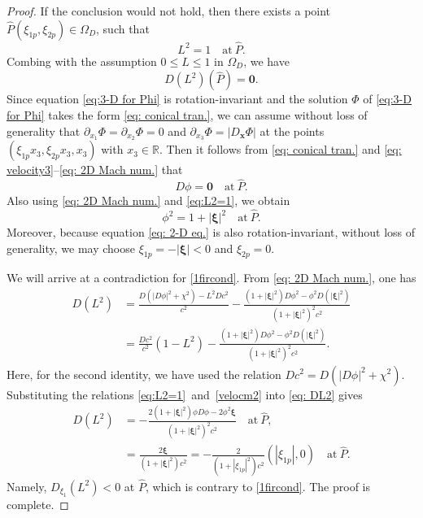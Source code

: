 \documentclass[reqno,12pt]{amsart}
\numberwithin{equation}{section}
\begin{document}
\begin{proof}
     If the conclusion would not hold, then there exists a point $\hat{P}(\xi_{1p},\xi_{2p})\in \Omega_D$, such that
     \begin{equation}\label{eq:L2=1}
         L^2=1\quad\text{at}~\hat{P}.
     \end{equation}
     Combing with the assumption $0\leq L\leq1$ in $\Omega_D$, we have
     \begin{equation}\label{1fircond}
         D(L^2)(\hat{P})=\bm{0}.
     \end{equation}
     Since equation \eqref{eq:3-D for Phi} is rotation-invariant and the solution $\Phi$ of \eqref{eq:3-D for Phi} takes the form \eqref{eq: conical tran.}, we can assume without loss of generality that $\partial_{x_1}\Phi=\partial_{x_2}\Phi=0$ and $\partial_{x_3}\Phi=|D_{\bm{x}}\Phi|$ at the points $(\xi_{1p}x_3,\xi_{2p}x_3,x_3)$ with $x_3\in \mathbb{R}$. Then it follows from \eqref{eq: conical tran.}  and \eqref{eq: velocity3}--\eqref{eq: 2D Mach num.} that
     \begin{equation}\label{velocm1}
        D\phi=\bm{0} \quad\text{at}~\hat{P}.
    \end{equation}
    Also using \eqref{eq: 2D Mach num.} and \eqref{eq:L2=1}, we obtain 
    \begin{equation}\label{velocm2}
        \phi^2=1+|\bm{\xi}|^{2} \quad\text{at}~\hat{P}.
    \end{equation}
    Moreover, because equation \eqref{eq: 2-D eq.} is also rotation-invariant, without loss of generality, we may choose $\xi_{1p}=-|\bm{\xi}|<0$ and $\xi_{2p}=0$. 
    
    We will arrive at a contradiction for \mbox{\eqref{1fircond}}. From \mbox{\eqref{eq: 2D Mach num.}}, one has
     \begin{equation}\label{eq: DL2}
        \begin{split}
           D(L^2)&=\frac{D(|D\phi|^2+\chi^2)-L^2Dc^2}{c^2}-\frac{(1+|\bm{\xi}|^2)D\phi^2-\phi^2D(|\bm{\xi}|^2)}{(1+|\bm{\xi}|^2)^2c^2}\\
            &=\frac{Dc^2}{c^2}(1-L^2)-\frac{(1+|\bm{\xi}|^2)D\phi^2-\phi^2D(|\bm{\xi}|^2)}{(1+|\bm{\xi}|^2)^2c^2}.
        \end{split}
    \end{equation}
    Here, for the second identity, we have used the relation \mbox{$Dc^2=D(|D\phi|^2+\chi^2)$}. Substituting the relations \mbox{\eqref{eq:L2=1} and \eqref{velocm2}} into \mbox{\eqref{eq: DL2}} gives
    \begin{equation*}
        \begin{split}
            D(L^2)&=-\frac{2(1+|\bm{\xi}|^2)\phi D\phi-2\phi^2\bm{\xi}}{(1+|\bm{\xi}|^2)^2c^2}\quad\text{at}~\hat{P},\\
            &=\frac{2\bm{\xi}}{(1+|\bm{\xi}|^2)c^2}=-\frac{2}{(1+|\xi_{1p}|^2)c^2}(|\xi_{1p}|,0)\quad\text{at}~\hat{P}.
        \end{split}
    \end{equation*}
    Namely, $D_{\xi_1}(L^2)<0$ at $\hat{P}$, which is contrary to \mbox{\eqref{1fircond}}. The proof is complete.
\end{proof}    
\end{document}
